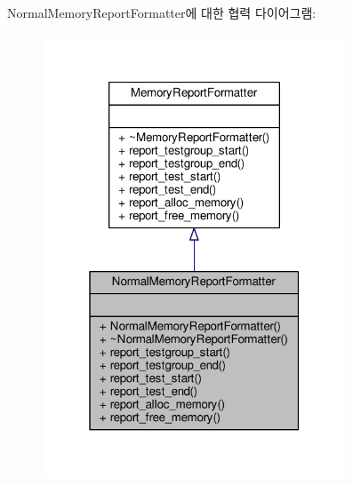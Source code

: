 Normal\+Memory\+Report\+Formatter에 대한 협력 다이어그램\+:
\nopagebreak
\begin{figure}[H]
\begin{center}
\leavevmode
\includegraphics[width=256pt]{class_normal_memory_report_formatter__coll__graph}
\end{center}
\end{figure}
